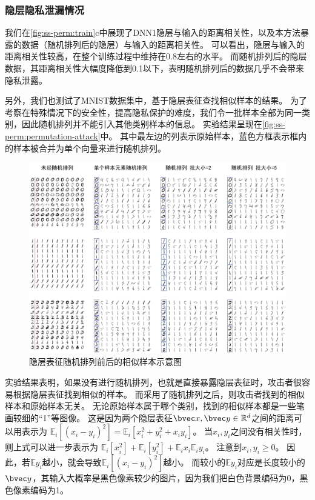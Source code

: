 \subsubsection{隐层隐私泄漏情况}
我们在\autoref{fig:ss-perm:train}c中展现了DNN1隐层与输入的距离相关性，以及本方法暴露的数据（随机排列后的隐层）与输入的距离相关性。
%
可以看出，隐层与输入的距离相关性较高，在整个训练过程中维持在0.8左右的水平。
而随机排列后的隐层数据，其距离相关性大幅度降低到0.1以下，表明随机排列后的数据几乎不会带来隐私泄露。
%


另外，我们也测试了MNIST数据集中，基于隐层表征查找相似样本的结果。
%
为了考察在特殊情况下的安全性，提高隐私保护的难度，我们令一批样本全部为同一类别，因此随机排列并不能引入其他类别样本的信息。
%
实验结果呈现在\autoref{fig:ss-perm:permutation-attack}中。
%
其中最左边的列表示原始样本，蓝色方框表示框内的样本被合并为单个向量来进行随机排列。


\begin{figure}[h!]
    \centering
    \includegraphics[width=\linewidth]{Z_Resources/ss-perm_permutation-attack.png}
    \caption{隐层表征随机排列前后的相似样本示意图}
    \label{fig:ss-perm:permutation-attack}
\end{figure}

实验结果表明，如果没有进行随机排列，也就是直接暴露隐层表征时，攻击者很容易根据隐层表征找到相似的样本。
%
而采用了随机排列之后，则攻击者找到的相似样本和原始样本无关。
%
无论原始样本属于哪个类别，找到的相似样本都是一些笔画较细的“1”等图像。
%
这是因为两个隐层表征$\bvec x, \bvec y \in \mathbb R^d$之间的距离可以用表示为
$\mathbb E_i [(x_i - y_i)^2] = \mathbb E_i [x_i^2 + y_i^2 + x_i y_i]$。
%
当$x_i, y_i$之间没有相关性时，则上式可以进一步表示为
$\mathbb E_i [x_i^2] + \mathbb E_i [y_i^2] + \mathbb E_i x_i \mathbb E_i y_i$。
%
注意到$x_i, y_i \ge 0$。
%
因此，若$\mathbb E y_i$越小，就会导致$\mathbb E_i [(x_i - y_i)^2]$越小。
%
而较小的$\mathbb Ey_i$对应是长度较小的$\bvec y$，其输入大概率是黑色像素较少的图片，因为我们把白色背景编码为0，黑色像素编码为1。
%
